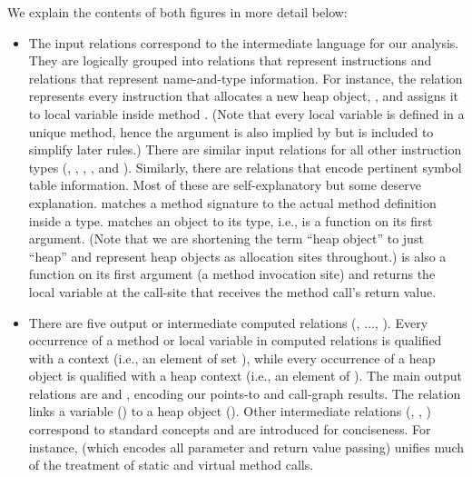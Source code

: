 We explain the contents of both figures in more detail below:

\begin{itemize}
\item The input relations correspond to the intermediate language for
  our analysis. They are logically grouped into relations that
  represent instructions and relations that represent name-and-type
  information. For instance, the  relation represents
  every instruction that allocates a new heap object, , and
  assigns it to local variable  inside method
  . (Note that every local variable is defined in a
  unique method, hence the  argument is also implied by
   but is included to simplify later rules.) There are similar
  input relations for all other instruction types (,
  , , , and
  ). Similarly, there are relations that encode
  pertinent symbol table information.  Most of these are
  self-explanatory but some deserve explanation. 
  matches a method signature to the actual method definition inside a
  type.  matches an object to its type, i.e., is a
  function on its first argument. (Note that we are shortening the
  term ``heap object'' to just ``heap'' and represent heap objects as
  allocation sites throughout.)  is also a
  function on its first argument (a method invocation site) and
  returns the local variable at the call-site that receives the method
  call's return value.
  
\item There are five output or intermediate computed relations
  (, $\ldots$, ). Every
  occurrence of a method or local variable in computed relations is
  qualified with a context (i.e., an element of set ), while
  every occurrence of a heap object is qualified with a heap context
  (i.e., an element of ). The main output relations are
   and , encoding our
  points-to and call-graph results. The 
  relation links a variable () to a heap object
  (). Other intermediate relations (,
  , ) correspond to
  standard concepts and are introduced for conciseness. For instance,
   (which encodes all parameter and return
  value passing) unifies much of the treatment of static and virtual
  method calls.


\end{itemize}
